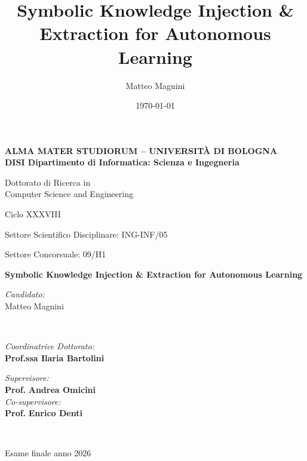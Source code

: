 \title{Symbolic Knowledge Injection \& Extraction for Autonomous Learning}
\author{Matteo Magnini}
\date{\today}

\begin{titlepage}
	\begin{center}

		\large
		\textbf{ALMA MATER STUDIORUM -- UNIVERSITÀ DI BOLOGNA \\ DISI Dipartimento di Informatica: Scienza e Ingegneria}
		\\
		\noindent\hrulefill
		\vspace{0.4cm}

		\Large
		Dottorato di Ricerca in \\
		Computer Science and Engineering

		\vspace{0.4cm}

		Ciclo XXXVIII

		\vspace{0.4cm}
		Settore Scientifico Disciplinare: ING-INF/05

		Settore Concorsuale: 09/H1

		\Huge
		\vspace{3cm}
		\textbf{
			Symbolic Knowledge Injection \& Extraction for Autonomous Learning
		}

		{\Large{
		\vspace{3cm}

		\textit{Candidato:\\}
		\centering
		Matteo Magnini}
		\\}
		\large
		\vspace{2.5cm}
		\begin{minipage}[t]{0.64\textwidth}
			\begin{flushleft}
				\textit{Coordinatrice Dottorato:}
				\\
				\textbf{Prof.ssa Ilaria Bartolini}
			\end{flushleft}
		\end{minipage}
		\begin{minipage}[t]{0.34\textwidth}
			\begin{flushright}
				\textit{Supervisore:}
				\\
				\textbf{Prof.} \textbf{Andrea Omicini}
				\\
				\vspace{0.4cm}
				\textit{Co-supervisore:}
				\\
				\textbf{Prof.} \textbf{Enrico Denti}
			\end{flushright}

		\end{minipage}\\

		\vfill
		\noindent\hrulefill
		\vspace{0.3cm}
		\Large

		Esame finale anno 2026
	\end{center}
\end{titlepage}
\restoregeometry
